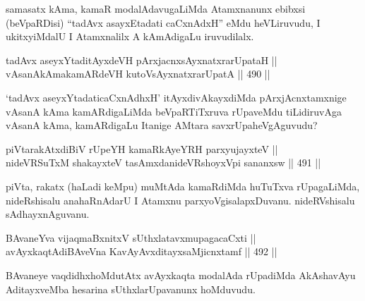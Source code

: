 \begin{artha}
samasatx kAma, kamaR modalAdavugaLiMda Atamxnanunx ebibxsi (beVpaRDisi)
``tadAvx asayxEtadati caCxnAdxH'' eMdu heVLiruvudu, I ukitxyiMdalU I
Atamxnalilx A kAmAdigaLu iruvudilalx.
\end{artha}


\begin{shl}
tadAvx aseyxYtaditAyxdeVH pArxjacnxsAyx\s \s natxrarUpataH || \\
vAsanAkAmakamARdeVH kutoV\s sAyx\s \s natxrarUpatA \hfill || 490 ||  
\end{shl}

\begin{artha}
`tadAvx aseyxYtadaticaCxnAdhxH' itAyxdivAkayxdiMda pArxjAcnxtamxnige
vAsanA kAma kamARdigaLiMda beVpaRTiTxruva rUpaveMdu tiLidiruvAga
vAsanA kAma, kamARdigaLu Itanige AMtara savxrUpa\break heVgAguvudu?
\end{artha}


\begin{shl}
piVtarakAtxdiBiV rUpeYH kamaRkAyeYRH parxyujayxteV || \\
nideVRSuTxM shakayxteV tasAmxdanideVRshoyxV\s pi sananxsw \hfill || 491 ||  
\end{shl}

\begin{artha}
piVta, rakatx (haLadi keMpu) muMtAda kamaRdiMda huTuTxva rUpagaLiMda,
nideRshisalu anahaRnAdarU I Atamxnu parxyoVgisalapxDuvanu.
nideRVshisalu sAdhayxnAguvanu.
\end{artha}

\begin{shl}
BAvaneYva vijaqmaBxnitxV sUthxlatavxmupagacaCxti || \\
avAyxkaqtAdiBAveVna KavAyAvxditayxsaMjicnxtamf \hfill || 492 ||  
\end{shl}

\begin{artha}
BAvaneye vaqdidhxhoMdutAtx avAyxkaqta modalAda rUpadiMda AkAshavAyu
AditayxveMba hesarina sUthxlarUpavanunx hoMduvudu.
\end{artha}


